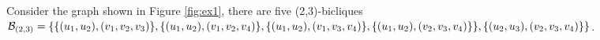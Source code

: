 Consider the graph shown in Figure \ref{fig:ex1}, there are five (2,3)-bicliques
 $ \mathcal{B}_{(2,3)} = \{\{(u_1, u_2), (v_1, v_2, v_3)\}, \{(u_1, u_2), (v_1, v_2, v_4)\},\{(u_1, u_2), (v_1,\\ v_3, v_4)\},\{(u_1, u_2), (v_2, v_3, v_4)\}\},\{(u_2, u_3), (v_2, v_3, v_4)\}\} $.

%

